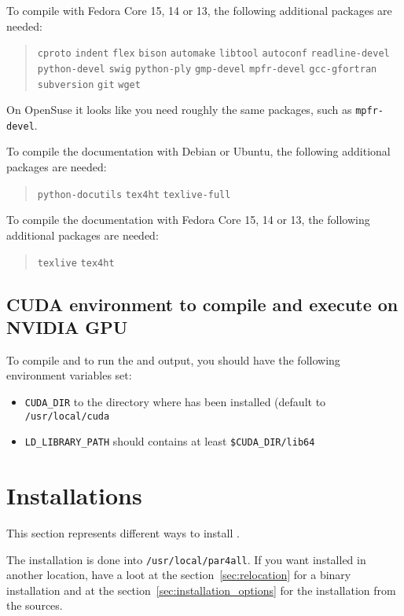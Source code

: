\documentclass[a4paper]{article}
\begin{document}
To compile \Apfa with Fedora Core 15, 14 or 13, the following additional
packages are needed:
\begin{quote}
  \texttt{cproto} \texttt{indent} \texttt{flex} \texttt{bison}
  \texttt{automake} \texttt{libtool} \texttt{autoconf}
  \texttt{readline-devel} \texttt{python-devel} \texttt{swig}
  \texttt{python-ply} \texttt{gmp-devel}
  \texttt{mpfr-devel} \texttt{gcc-gfortran} \texttt{subversion}
  \texttt{git} \texttt{wget}
\end{quote}
On OpenSuse it looks like you need roughly the same packages, such as
\texttt{mpfr-devel}.

To compile the documentation with Debian or Ubuntu, the following
additional packages are needed:
\begin{quote}
  \texttt{python-docutils} \texttt{tex4ht} \texttt{texlive-full}
\end{quote}

To compile the documentation with Fedora Core 15, 14 or 13, the following
additional packages are needed:
\begin{quote}
  \texttt{texlive} \texttt{tex4ht}
\end{quote}


\subsection{CUDA environment to compile and execute on NVIDIA GPU}

To compile and to run the \Acuda and \Aopencl output, you should have the following
environment variables set:
\begin{itemize}
\item \verb|CUDA_DIR| to the directory where \Acuda has been installed (default to
  \texttt{/usr/local/cuda}
\item \verb|LD_LIBRARY_PATH| should contains at least \verb|$CUDA_DIR/lib64|
\end{itemize}


\section{Installations}
\label{sec:installation}

This section represents different ways to install \Apfa.

The installation is done into \texttt{/usr/local/par4all}. If you want
\Apfa installed in another location, have a loot at the
section~\ref{sec:relocation} for a binary installation and at the
section~\ref{sec:installation_options} for the installation from the
sources.
\end{document}
